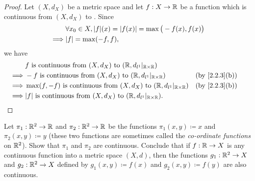 \begin{proof}
  Let \((X, d_X)\) be a metric space and let \(f : X \to \mathbb{R}\) be a function which is continuous from \((X, d_X)\) to \(\).
  Since
  \begin{align*}
             & \forall x_0 \in X, \abs{f}(x) = \abs{f(x)} = \max\big(-f(x), f(x)\big) \\
    \implies & \abs{f} = \max(-f, f),
  \end{align*}
  we have
  \begin{align*}
             & f \text{ is continuous from } (X, d_X) \text{ to } (\R, d_{l^1}|_{\R \times \R})                                            \\
    \implies & -f \text{ is continuous from } (X, d_X) \text{ to } (\R, d_{l^1}|_{\R \times \R})          &  & \text{(by \cref{2.2.3}(b))} \\
    \implies & \max(f, -f) \text{ is continuous from } (X, d_X) \text{ to } (\R, d_{l^1}|_{\R \times \R}) &  & \text{(by \cref{2.2.3}(b))} \\
    \implies & \abs{f} \text{ is continuous from } (X, d_X) \text{ to } (\R, d_{l^1}|_{\R \times \R}).
  \end{align*}
\end{proof}

\begin{ex}\label{ex:2.2.4}
  Let \(\pi_1 : \mathbb{R}^2 \to \mathbb{R}\) and \(\pi_2 : \mathbb{R}^2 \to \mathbb{R}\) be the functions \(\pi_1(x, y) \coloneqq x\) and \(\pi_2(x, y) \coloneqq y\) (these two functions are sometimes called the \emph{co-ordinate functions} on \(\mathbb{R}^2\)).
  Show that \(\pi_1\) and \(\pi_2\) are continuous.
  Conclude that if \(f : \mathbb{R} \to X\) is any continuous function into a metric space \((X, d)\), then the functions \(g_1 : \mathbb{R}^2 \to X\) and \(g_2 : \mathbb{R}^2 \to X\) defined by \(g_1(x, y) \coloneqq f(x)\) and \(g_2(x, y) \coloneqq f(y)\) are also continuous.
\end{ex}

